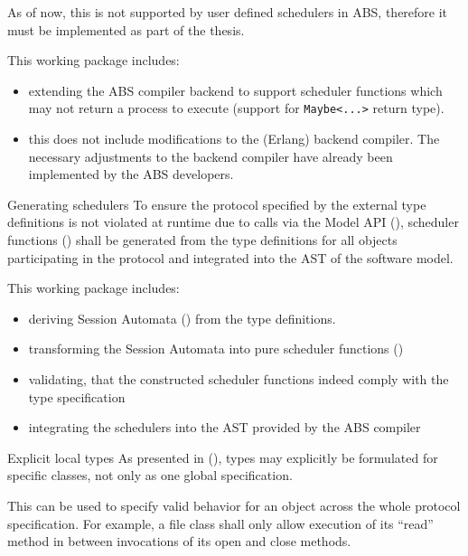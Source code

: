 \documentclass[paper=a4,nochapname,accentcolor=tud9c]{tudexercise}
\makeatletter
\newcommand\textcitep[1]{\mkbibparens{\textcite{#1}}}
\def\namedlabel#1#2{\begingroup
    #1%
    \def\@currentlabel{\thedescriptcount}%
    \phantomsection\label{#2}\endgroup
}
\newcounter{descriptcount}
\renewcommand*\thedescriptcount{[\Alph{descriptcount}]}}
\renewcommand*\thedescriptcount{\roman{descriptcount}}}
\makeatother
\begin{document}
\begin{enumdescript}
    As of now, this is not supported by user defined schedulers in ABS,
    therefore it must be implemented as part of the thesis.

    This working package includes:
    \begin{itemize}
      \item extending the ABS compiler backend to support scheduler functions which
        may not return a process to execute (support for \texttt{Maybe<...>}
        return type).
        \item this does not include modifications to the (Erlang) backend
          compiler. The necessary adjustments to the backend compiler have
          already been implemented by the ABS developers. %
    \end{itemize}
  \item[\namedlabel{Generating schedulers}{WPGenSchedulers}]%
    To ensure the protocol specified by the external type definitions is not
    violated at runtime due to calls via the Model API \textcitep{schlatte2018release}, scheduler functions \textcitep{bjork2013user}
    shall be generated from the type definitions for all objects participating
    in the protocol and integrated into the AST of the software model.

    This working package includes:
    \begin{itemize}
      \item deriving Session Automata \textcitep{kamburjan2016session} from the type definitions.
      \item transforming the Session Automata into pure scheduler functions \textcitep{bjork2013user}
      \item validating, that the constructed scheduler functions indeed comply with the
        type specification
      \item integrating the schedulers into the AST provided by the ABS compiler
    \end{itemize}
  \item[\namedlabel{Explicit local types}{WPExplicitTypes}]%
    As presented in \textcitep{kamburjan2016session}, types may explicitly be
    formulated for specific classes, not only as one global specification.

    This can be used to specify valid behavior for an object across the whole
    protocol specification. For example, a file class shall only allow execution
    of its ``read'' method in between invocations of its open and close methods.


\end{enumdescript}
\end{document}
